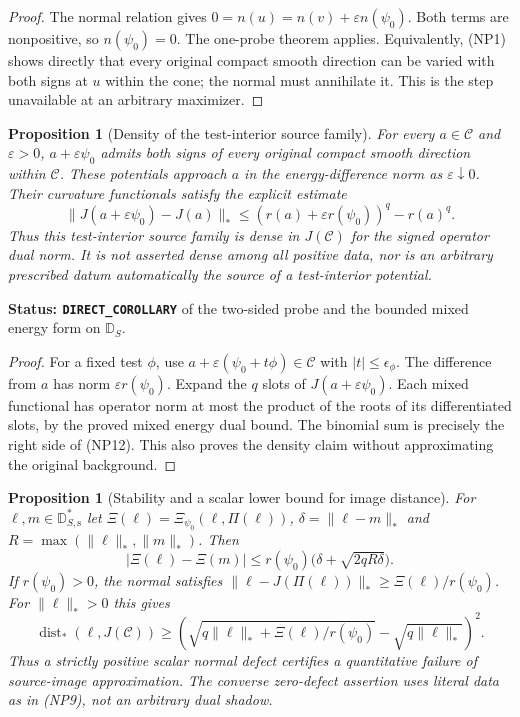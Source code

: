 \documentclass[11pt,a4paper]{article}
\numberwithin{equation}{section}
\newtheorem{proposition}[theorem]{Proposition}
\theoremstyle{definition}
\theoremstyle{remark}
\begin{document}
\begin{proof}
The normal relation gives
$0=n(u)=n(v)+\varepsilon n(\psi_0)$.
Both terms are nonpositive, so $n(\psi_0)=0$.
The one-probe theorem applies.  Equivalently,
\textup{(NP1)} shows directly that every original
compact smooth direction can be varied with both
signs at $u$ within the cone; the normal must
annihilate it.  This is the step unavailable at
an arbitrary maximizer.
\end{proof}

\begin{proposition}[Density of the test-interior source family]
\label{prop:r12-dense-test-interior-sources}
For every $a\in\mathscr C$ and $\varepsilon>0$,
$a+\varepsilon\psi_0$ admits both signs of every
original compact smooth direction within $\mathscr C$.
These potentials approach $a$ in the energy-difference
norm as $\varepsilon\downarrow0$.  Their curvature
functionals satisfy the explicit estimate
\[
 \|J(a+\varepsilon\psi_0)-J(a)\|_*
       \le (r(a)+\varepsilon r(\psi_0))^q-r(a)^q.
 \tag{NP12}
\]
Thus this test-interior source family is dense in
$J(\mathscr C)$ for the signed operator dual norm.
It is not asserted dense among all positive data,
nor is an arbitrary prescribed datum automatically
the source of a test-interior potential.
\end{proposition}

\noindent\textbf{Status: \texttt{DIRECT\_COROLLARY}}
of the two-sided probe and the bounded mixed energy
form on $\mathbb D_S$.

\begin{proof}
For a fixed test $\phi$, use
$a+\varepsilon(\psi_0+t\phi)\in\mathscr C$
with $|t|\le\epsilon_\phi$.  The difference from
$a$ has norm $\varepsilon r(\psi_0)$.
Expand the $q$ slots of $J(a+\varepsilon\psi_0)$.
Each mixed functional has operator norm at most
the product of the roots of its differentiated
slots, by the proved mixed energy dual bound.
The binomial sum is precisely the right side of
\textup{(NP12)}.  This also proves the density
claim without approximating the original background.
\end{proof}

\begin{proposition}[Stability and a scalar lower bound for image distance]
\label{prop:r12-normal-probe-stability}
For $\ell,m\in\mathbb D_{S,\mathrm s}^*$ let
$\Xi(\ell)=\Xi_{\psi_0}(\ell,\Pi(\ell))$,
$\delta=\|\ell-m\|_*$ and
$R=\max(\|\ell\|_*,\|m\|_*)$.  Then
\[
            |\Xi(\ell)-\Xi(m)|
            \le r(\psi_0)\bigl(\delta+\sqrt{2qR\delta}\bigr).
 \tag{NP13}
\]
If $r(\psi_0)>0$, the normal satisfies
$\|\ell-J(\Pi(\ell))\|_*\ge\Xi(\ell)/r(\psi_0)$.
For $\|\ell\|_*>0$ this gives
\[
 \operatorname{dist}_*(\ell,J(\mathscr C))
 \ge
 \left(\sqrt{q\|\ell\|_*+\Xi(\ell)/r(\psi_0)}
                        -\sqrt{q\|\ell\|_*}\right)^2.
 \tag{NP14}
\]
Thus a strictly positive scalar normal defect certifies
a quantitative failure of source-image approximation.
The converse zero-defect assertion uses literal data
as in \textup{(NP9)}, not an arbitrary dual shadow.
\end{proposition}
\end{document}
